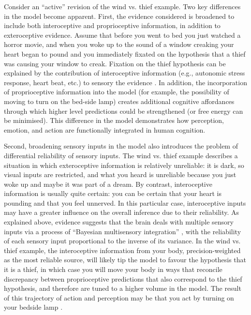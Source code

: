 \begin{CJK}{UTF8}{gbsn}
Consider an ``active'' revision of the wind vs. thief example.  Two key differences in the model become apparent.  First, the evidence considered is broadened to include both interoceptive and proprioceptive information, in addition to exteroceptive evidence.  Assume that before you went to bed you just watched a horror movie, and when you woke up to the sound of a window creaking your heart began to pound and you immediately fixated on the hypothesis that a thief was causing your window to creak.  Fixation on the thief hypothesis can be explained by the contribution of interoceptive information (e.g., autonomic stress response, heart beat, etc.) to sensory the evidence \citep{Pezzulo2014}.  In addition, the incorporation of proprioceptive information into the model (for example, the possibility of moving to turn on the bed-side lamp) creates additional cognitive affordances through which higher level predictions could be strengthened (or free energy can be minimised).  This difference in the model demonstrates how perception, emotion, and action are functionally integrated in human cognition.

Second, broadening sensory inputs in the model also introduces the problem of differential reliability of sensory inputs.  The wind vs. thief example describes a situation in which exteroceptive information is relatively unreliable: it is dark, so visual inputs are restricted, and what you heard is unreliable because you just woke up and maybe it was part of a dream.  By contrast, interoceptive information is usually quite certain: you can be certain that your heart is pounding and that you feel unnerved.  In this particular case, interoceptive inputs may have a greater influence on the overall inference due to their reliability.  As explained above, evidence suggests that the brain deals with multiple sensory inputs via a process of ``Bayesian multisensory integration'' \citep{Ernst2004}, with the reliability of each sensory input proportional to the inverse of its variance.  In the wind vs. thief example, the interoceptive information from your body, precision-weighted as the most reliable source, will likely tip the model to favour the hypothesis that it is a thief, in which case you will move your body in ways that reconcile discrepancy between proprioceptive predictions that also correspond to the thief hypothesis, and therefore are tuned to a higher volume in the model. The result of this trajectory of action and perception may be that you act by turning on your bedside lamp \citep{Pezzulo2014}.


\end{CJK}
